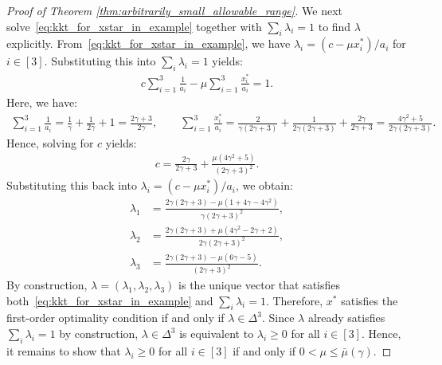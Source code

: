 \documentclass{article}
\theoremstyle{plain}
\begin{document}
\begin{proof}[Proof of Theorem \ref{thm:arbitrarily_small_allowable_range}]
    We next solve~\eqref{eq:kkt_for_xstar_in_example} together with $\sum_i \lambda_i = 1$ to find $\lambda$ explicitly.
    From~\eqref{eq:kkt_for_xstar_in_example}, we have $\lambda_i = (c - \mu x_i^\ast)/a_i$ for $i \in [3]$.
    Substituting this into $\sum_i \lambda_i = 1$ yields:
    \begin{align*}
        c \sum_{i=1}^3 \frac{1}{a_i} - \mu \sum_{i=1}^3 \frac{x_i^\ast}{a_i} = 1.
    \end{align*}
    Here, we have:
    \begin{align*}
        \sum_{i=1}^3 \frac{1}{a_i} = \frac{1}{\gamma} + \frac{1}{2\gamma} + 1 = \frac{2\gamma+3}{2\gamma}, \qquad
        \sum_{i=1}^3 \frac{x_i^\ast}{a_i} = \frac{2}{\gamma(2\gamma+3)} + \frac{1}{2\gamma(2\gamma+3)} + \frac{2\gamma}{2\gamma+3} = \frac{4\gamma^2 + 5}{2\gamma(2\gamma+3)}.
    \end{align*}
    Hence, solving for $c$ yields:
    \begin{align*}
        c = \frac{2\gamma}{2\gamma+3} + \frac{\mu(4\gamma^2 + 5)}{(2\gamma+3)^2}.
    \end{align*}
    Substituting this back into $\lambda_i = (c - \mu x_i^\ast)/a_i$, we obtain:
    \begin{align*}
        \lambda_1 & = \frac{2\gamma(2\gamma+3) - \mu(1 + 4\gamma - 4\gamma^2)}{\gamma(2\gamma+3)^2},   \\
        \lambda_2 & = \frac{2\gamma(2\gamma+3) + \mu(4\gamma^2 - 2\gamma + 2)}{2\gamma(2\gamma+3)^2}, \\
        \lambda_3 & = \frac{2\gamma(2\gamma+3) - \mu(6\gamma - 5)}{(2\gamma+3)^2}.
    \end{align*}
    By construction, $\lambda = (\lambda_1, \lambda_2, \lambda_3)$ is the unique vector that satisfies both~\eqref{eq:kkt_for_xstar_in_example} and $\sum_i \lambda_i = 1$.
    Therefore, $x^\ast$ satisfies the first-order optimality condition if and only if $\lambda \in \Delta^3$.
    Since $\lambda$ already satisfies $\sum_i \lambda_i = 1$ by construction, $\lambda \in \Delta^3$ is equivalent to $\lambda_i \geq 0$ for all $i \in [3]$.
    Hence, it remains to show that $\lambda_i \geq 0$ for all $i \in [3]$ if and only if $0 < \mu \leq \bar{\mu}(\gamma)$.


\end{proof}
\end{document}
